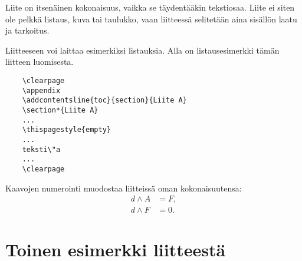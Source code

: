 \documentclass[english, 12pt, a4paper, elec, utf8, a-1b, online]{aaltothesis}
\begin{document}
Liite on itsen\"ainen kokonaisuus, vaikka se t\"aydent\"a\"akin tekstiosaa.
Liite ei siten ole pelkk\"a listaus, kuva tai taulukko, vaan 
liitteess\"a selitet\"a\"an aina sis\"all\"on laatu ja tarkoitus.

Liitteeseen voi laittaa esimerkiksi listauksia. Alla on 
listausesimerkki t\"am\"an liitteen luomisesta.

\begin{verbatim}
	\clearpage
	\appendix
	\addcontentsline{toc}{section}{Liite A}
	\section*{Liite A}
	...
	\thispagestyle{empty}
	...
	teksti\"a
	...
	\clearpage
\end{verbatim}

Kaavojen numerointi muodostaa liitteiss\"a oman kokonaisuutensa:
\begin{align}
d \wedge A &= F, \label{liitekaava1}\\
d \wedge F &= 0. \label{liitekaava2}
\end{align}


\clearpage
\section{Toinen esimerkki liitteest\"a\label{LiiteB}}

\end{document}
